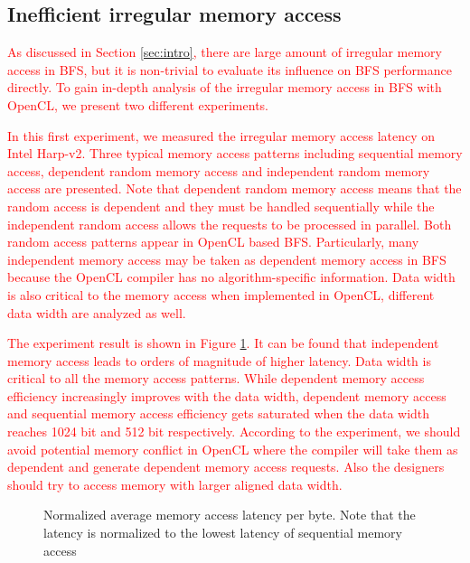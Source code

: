 
\subsection{Inefficient irregular memory access}
\textcolor{red}{
As discussed in Section \ref{sec:intro}, there are large amount of irregular memory access in BFS, 
but it is non-trivial to evaluate its influence on BFS performance directly. To gain in-depth 
analysis of the irregular memory access in BFS with OpenCL, we present two different experiments.}

\textcolor{red}{
In this first experiment, we measured the irregular memory access latency on Intel Harp-v2.
Three typical memory access patterns including sequential memory access, dependent random memory access 
and independent random memory access are presented. Note that dependent random memory access 
means that the random access is dependent and they must be handled sequentially while the independent random 
access allows the requests to be processed in parallel. Both random access patterns appear in OpenCL based BFS.
Particularly, many independent memory access may be taken as dependent memory access in BFS because the 
OpenCL compiler has no algorithm-specific information. Data width is also critical to the memory access 
when implemented in OpenCL, different data width are 
analyzed as well.} 

\textcolor{red}{
The experiment result is shown in Figure \ref{fig:avg-mem-lat}. It can be found that independent memory 
access leads to orders of magnitude of higher latency. Data width is critical to all the memory access patterns.
While dependent memory access efficiency increasingly improves with the data width, dependent memory access and sequential memory 
access efficiency gets saturated when the data width reaches 1024 bit and 512 bit respectively. According to the experiment, 
we should avoid potential memory conflict in OpenCL where the compiler will take them as dependent and generate 
dependent memory access requests. Also the designers should try to access memory with larger aligned data width. }
\begin{figure}
    \caption{Normalized average memory access latency per byte. Note that the latency is normalized to the 
	lowest latency of sequential memory access}
\label{fig:avg-mem-lat}
\vspace{-0.5em}
\end{figure}

